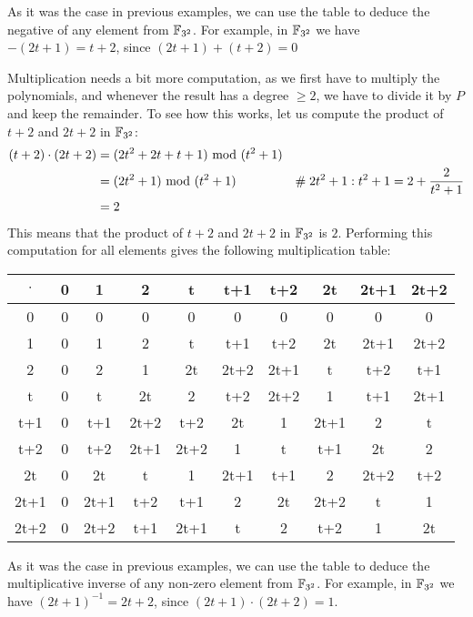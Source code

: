 \begin{example}
As it was the case in previous examples, we can use the table to deduce the negative of any element from $\mathbb{F}_{3^2}$. For example, in $\mathbb{F}_{3^2}$ we have $-(2t+1)= t+2$, since $(2t+1) + (t+2)=0$

Multiplication needs a bit more computation, as we first have to multiply the polynomials, and whenever the result has a degree $\geq 2$, we have to divide it by $P$ and keep the remainder. To see how this works, let us compute the product of $t+2$ and $2t+2$ in $\mathbb{F}_{3^2}$:
\begin{align*}
(t+2) \cdot (2t+2) &= (2t^2 + 2t + t + 1) \text{ mod } (t^2+1) \\
                   &= (2t^2+1) \text{ mod } (t^2+1) & \#\; 2t^2+1:t^2+1= 2 + \frac{2}{t^2+1} \\
                   &= 2
\end{align*}
This means that the product of $t+2$ and $2t+2$ in $\mathbb{F}_{3^2}$ is $2$. Performing this computation for all elements gives the following multiplication table:
\begin{center}
  \begin{tabular}{c | c c c c c c c c c}
$\cdot$ & 0    & 1    & 2    & t    & t+1  & t+2  & 2t   & 2t+1 & 2t+2 \\\hline
      0 & 0    & 0    & 0    & 0    & 0    & 0    & 0    & 0    & 0 \\
      1 & 0    & 1    & 2    & t    & t+1  & t+2  & 2t   & 2t+1 & 2t+2\\
      2 & 0    & 2    & 1    & 2t   & 2t+2 & 2t+1 & t    & t+2  & t+1 \\
      t & 0    & t    & 2t   & 2    & t+2  & 2t+2 & 1    & t+1  & 2t+1  \\
    t+1 & 0    & t+1  & 2t+2 & t+2  & 2t   & 1    & 2t+1 & 2    & t   \\
    t+2 & 0    & t+2  & 2t+1 & 2t+2 & 1    & t    & t+1  & 2t   & 2    \\
     2t & 0    & 2t   & t    & 1    & 2t+1 & t+1  & 2  & 2t+2 & t+2\\
   2t+1 & 0    & 2t+1 & t+2  & t+1  & 2    & 2t   & 2t+2 & t    & 1    \\
   2t+2 & 0    & 2t+2 & t+1  & 2t+1 & t    & 2    & t+2  & 1     & 2t
  \end{tabular}
\end{center}
As it was the case in previous examples, we can use the table to deduce the multiplicative inverse of any non-zero element from $\mathbb{F}_{3^2}$. For example, in $\mathbb{F}_{3^2}$ we have $(2t+1)^{-1}= 2t+2 $, since $(2t+1) \cdot (2t+2)=1$.


\end{example}
